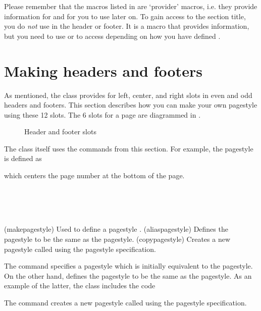 Please remember that the macros listed in  are
`provider' macros, i.e. they provide information for \cmd{\leftmark}
and \cmd{\rightmark} for you to use later on. To gain access to the
section title, you do \emph{not} use \cmd{\sectionmark} in the header
or footer. It is a macro that provides information, but you need to
use \cmd{\leftmark} or \cmd{\rightmark} to access depending on how you
have defined \cmd{\sectionmark}.


\section{Making headers and footers}

    As mentioned, the class provides for left, center, and right slots in
even and odd headers and footers. 
This section describes how you can make 
your own pagestyle using these 12 slots. The 6 slots for a page 
are diagrammed in .

\begin{figure}
\centering
\headerfooterdiagram
\caption{Header and footer slots} \label{lay:header}
\end{figure}

    The class itself uses the commands from this section. For example,
the  pagestyle is defined as
\begin{lcode}
\end{lcode}
which centers the page number at the bottom of the page. 
    

\begin{syntax}
\cmd{\makepagestyle} \\
\cmd{\aliaspagestyle} \\
\cmd{\copypagestyle}\\
\end{syntax}
\glossary(makepagestyle)%
  {}%
  {Used to define a pagestyle .}
\glossary(aliaspagestyle)%
  {}%
  {Defines the  pagestyle to be the same as the 
  pagestyle.}
\glossary(copypagestyle)%
  {}%
  {Creates a new pagestyle called  using the 
   pagestyle specification.}

The command \cmd{\makepagestyle} specifies a pagestyle  which
is initially equivalent to the  pagestyle. On the other hand,
\cmd{\aliaspagestyle} defines the  pagestyle to be the same as
the  pagestyle. As an example of the latter, the class includes
the code
\begin{lcode}
\end{lcode}
The \cmd{\copypagestyle} command creates a new pagestyle called 
using the  pagestyle specification.

